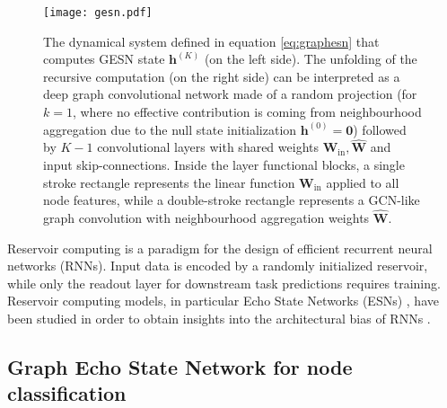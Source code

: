 \documentclass[final,5p,times,twocolumn]{elsarticle}
\begin{document}
\begin{figure*}
	\centering
	\texttt{[image: gesn.pdf]}
	\caption{The dynamical system defined in equation \eqref{eq:graphesn} that computes GESN state $\mathbf{h}^{(K)}$ (on the left side). The unfolding of the recursive computation (on the right side) can be interpreted as a deep graph convolutional network made of a random projection (for $k=1$, where no effective contribution is coming from neighbourhood aggregation due to the null state initialization $\mathbf{h}^{(0)} = \mathbf{0}$) followed by $K-1$ convolutional layers with shared weights $\mathbf{W}_{\mathrm{in}}, \mathbf{\hat{W}}$ and input skip-connections. Inside the layer functional blocks, a single stroke rectangle represents the linear function $\mathbf{W}_{\mathrm{in}}$ applied to all node features, while a double-stroke rectangle represents a GCN-like graph convolution with neighbourhood aggregation weights $\mathbf{\hat{W}}$.}
	\label{fig:gesn}
\end{figure*}

Reservoir computing \citep{Nakajima2021,Lukosevicius2009,Verstraeten2007} is a paradigm for the design of efficient recurrent neural networks (RNNs).
Input data is encoded by a randomly initialized reservoir, while only the readout layer for downstream task predictions requires training.
Reservoir computing models, in particular Echo State Networks (ESNs) \citep{Jaeger2004}, have been studied in order to obtain insights into the architectural bias of RNNs \citep{Hammer2003,Gallicchio2011}.

\subsection{Graph Echo State Network for node classification}
\end{document}
